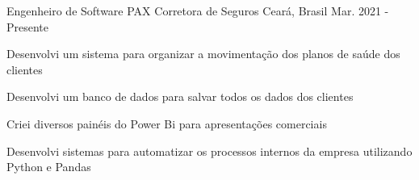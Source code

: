 \begin{cventries}
  \cventry
    {Engenheiro de Software} %
    {PAX Corretora de
    Seguros} %
    {Ceará, Brasil} %
    {Mar. 2021 - Presente} %
    {
      \begin{cvitems} %
        \item {Desenvolvi um sistema para organizar a movimentação dos planos de saúde dos clientes}
        \item {Desenvolvi um banco de dados
        para salvar todos os dados dos clientes}
        \item {Criei diversos painéis do Power Bi para apresentações comerciais}
        \item {Desenvolvi
        sistemas para automatizar os processos internos da empresa utilizando Python e Pandas}
      \end{cvitems}
    }

\end{cventries}
